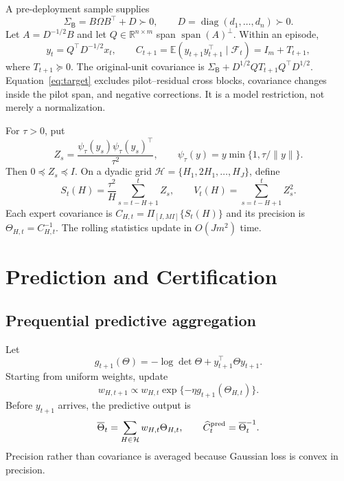 \documentclass{article}
\theoremstyle{definition}
\theoremstyle{remark}
\newcommand{\R}{\mathbb R}
\newcommand{\E}{\mathbb E}
\newcommand{\F}{\mathcal F}
\newcommand{\Hh}{\mathcal H}
\newcommand{\diag}{\operatorname{diag}}
\newcommand{\base}{\mathsf B}
\begin{document}
A pre-deployment sample supplies
\begin{equation}
 \Sigma_{\base}=B\Omega B^\top+D\succ0,\qquad D=\diag(d_1,\ldots,d_n)\succ0.
 \label{eq:pilot}
\end{equation}
Let $A=D^{-1/2}B$ and let $Q\in\R^{n\times m}$ span $\operatorname{span}(A)^\perp$.  Within an episode,
\begin{equation}
 y_t=Q^\top D^{-1/2}x_t,\qquad
 C_{t+1}=\E(y_{t+1}y_{t+1}^\top\mid\F_t)=I_m+T_{t+1},
 \label{eq:target}
\end{equation}
where $T_{t+1}\succeq0$.  The original-unit covariance is
$\Sigma_{\base}+D^{1/2}QT_{t+1}Q^\top D^{1/2}$.  Equation~\eqref{eq:target} excludes pilot--residual cross blocks, covariance changes inside the pilot span, and negative corrections.  It is a model restriction, not merely a normalization.

For $\tau>0$, put
\begin{equation}
 Z_s=\frac{\psi_\tau(y_s)\psi_\tau(y_s)^\top}{\tau^2},\qquad
 \psi_\tau(y)=y\min\{1,\tau/\|y\|\}.
\end{equation}
Then $0\preceq Z_s\preceq I$.  On a dyadic grid $\Hh=\{H_1,2H_1,\ldots,H_J\}$, define
\begin{equation}
 S_t(H)=\frac{\tau^2}{H}\sum_{s=t-H+1}^tZ_s,\qquad
 V_t(H)=\sum_{s=t-H+1}^tZ_s^2.
 \label{eq:rolling}
\end{equation}
Each expert covariance is $C_{H,t}=\Pi_{[I,MI]}\{S_t(H)\}$ and its precision is $\Theta_{H,t}=C_{H,t}^{-1}$.  The rolling statistics update in $O(Jm^2)$ time.

\section{Prediction and Certification}
\label{sec:method}

\subsection{Prequential predictive aggregation}

Let
\begin{equation}
 g_{t+1}(\Theta)=-\log\det\Theta+y_{t+1}^\top\Theta y_{t+1}.
\end{equation}
Starting from uniform weights, update
\begin{equation}
 w_{H,t+1}\propto w_{H,t}\exp\{-\eta g_{t+1}(\Theta_{H,t})\}.
 \label{eq:weights}
\end{equation}
Before $y_{t+1}$ arrives, the predictive output is
\begin{equation}
 \overline\Theta_t=\sum_{H\in\Hh}w_{H,t}\Theta_{H,t},\qquad
 \widehat C_t^{\rm pred}=\overline\Theta_t^{-1}.
 \label{eq:predictive}
\end{equation}
Precision rather than covariance is averaged because Gaussian loss is convex in precision.
\end{document}
